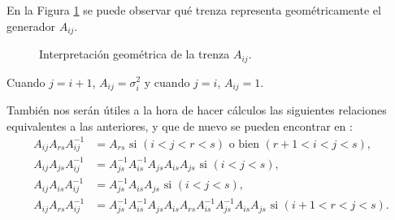 \documentclass[TFG.tex]{subfiles}
\begin{document}

En la Figura \ref{generador} se puede observar qué trenza representa geométricamente el generador $A_{ij}$. 

\begin{figure}[h!]
\centering
{}
\caption{Interpretación geométrica de la trenza $A_{ij}$.}\label{generador}
\end{figure}


\begin{nota}
Cuando $j=i+1$, $A_{ij}=\sigma_i^2$ y cuando $j=i$, $A_{ij}=1$. 
\end{nota}

También nos serán útiles a la hora de hacer cálculos las siguientes relaciones equivalentes a las anteriores, y que de nuevo se pueden encontrar en \cite{polynomial}:
\begin{align*}
A_{ij}A_{rs}A_{ij}^{-1}&=A_{rs}\text{ si } (i<j<r<s)\text{ o bien } (r+1<i<j<s),\\
A_{ij}A_{js}A_{ij}^{-1}&=A_{js}^{-1}A_{is}^{-1}A_{js}A_{is}A_{js} \text{ si } (i<j<s),\\
A_{ij}A_{is}A_{ij}^{-1}&=A_{js}^{-1}A_{is}A_{js}\text{ si } (i<j<s),\\
A_{ij}A_{rs}A_{ij}^{-1}&=A_{js}^{-1}A_{is}^{-1}A_{js}A_{is}A_{rs}A_{is}^{-1}A_{js}^{-1}A_{is}A_{js}\text{ si } (i+1<r<j<s).
\end{align*}
\end{document}
